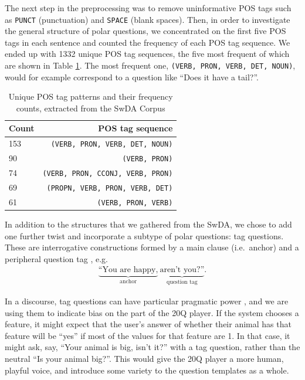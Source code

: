 \documentclass[11pt,a4paper]{article}
\begin{document}
The next step in the preprocessing was to remove uninformative POS tags such as \texttt{PUNCT} (punctuation) and \texttt{SPACE} (blank spaces).
Then, in order to investigate the general structure of polar questions, we concentrated on the first five POS tags in each sentence and counted the frequency of each POS tag sequence.
We ended up with 1332 unique POS tag sequences, the five most frequent of which are shown in Table \ref{tab:pos_patterns}.
The most frequent one, \texttt{(VERB, PRON, VERB, DET, NOUN)}, would for example correspond to a question like ``Does it have a tail?''.

\begin{table}
\centering
{\small
\begin{tabular}{lr}
	\toprule
	Count & POS tag sequence \\ \midrule
    153 & \texttt{(VERB, PRON, VERB, DET, NOUN)}\\
	90 & \texttt{(VERB, PRON)}\\
	74 & \texttt{(VERB, PRON, CCONJ, VERB, PRON)}\\
	69 & \texttt{(PROPN, VERB, PRON, VERB, DET)}\\
	61 & \texttt{(VERB, PRON, VERB)}\\
	\bottomrule
\end{tabular}
}
\caption{Unique POS tag patterns and their frequency counts, extracted from the SwDA Corpus}
\label{tab:pos_patterns}
\end{table}

In addition to the structures that we gathered from the SwDA, we chose to add one further twist and incorporate a subtype of polar questions: tag questions.
These are interrogative constructions formed by a main clause (i.e.\ anchor) and a peripheral question tag \citep{TottieEa2006, Bonsignori2007, Bawden2017}, e.g. 
\begin{gather*}
    \underbrace{\text{``You are happy,}}_{\text{anchor}}\ \underbrace{\text{aren't you?''}}_{\text{question tag}}. 
\end{gather*}

In a discourse, tag questions can have particular pragmatic power \citep{TottieEa2006}, and we are using them to indicate bias on the part of the 20Q player.
If the system chooses a feature, it might expect that the user's answer of whether their animal has that feature will be ``yes'' if most of the values for that feature are 1.
In that case, it might ask, say, ``Your animal is big, isn't it?'' with a tag question, rather than the neutral ``Is your animal big?''.
This would give the 20Q player a more human, playful voice, and introduce some variety to the question templates as a whole.
\end{document}
